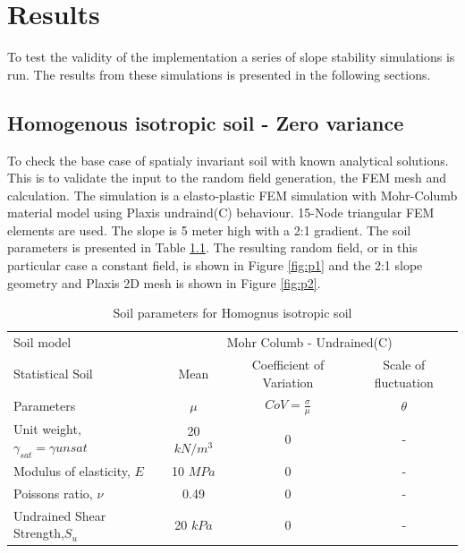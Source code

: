 \chapter[Results]{Results}
To test the validity of the implementation a series of slope stability simulations is run.
The results from these simulations is presented in the following sections.


\section{Homogenous isotropic soil - Zero variance}

To check the base case of spatialy invariant soil with known analytical solutions. This is to validate the input to the random field generation, the FEM mesh and calculation. The simulation is a elasto-plastic FEM simulation with Mohr-Columb material model using Plaxis undraind(C) behaviour. 15-Node triangular FEM elements are used. The slope is 5 meter high with a 2:1 gradient.
The soil parameters is presented in Table \ref{tab1}. The resulting random field, or in this particular case a constant field, is shown in Figure \ref{fig:p1} and the 2:1 slope geometry and Plaxis 2D mesh is shown in Figure \ref{fig:p2}.


\begin{table}[h]
	\centering\small
	\caption{Soil parameters for Homognus isotropic soil}
	\label{tab1}
		\begin{tabular*}{\textwidth}{@{\extracolsep{\fill}}lccc}
			\toprule
			 Soil model  &\multicolumn{3}{c}{Mohr Columb - Undrained(C)}\\
  \cmidrule{2-4}
			Statistical Soil	& Mean		 	& Coefficient of Variation 		& Scale of fluctuation \\
			Parameters	  	& $\mu$ 		&  $CoV = \frac{\sigma}{\mu}$ 		& $\theta$ \\
        
			\midrule
			  Unit weight, $\gamma_{sat}=\gamma{unsat}$ & 20 $kN/m^3$ & 0 & - \\
		          Modulus of elasticity, $E$ & 10 $MPa$ & 0 & - \\
		          Poissons ratio, $\nu$ & 0.49 & 0 & - \\
		          Undrained Shear Strength,$S_u$ & 20 $kPa$ & 0 & - \\
			\bottomrule
		\end{tabular*}
\end{table}

